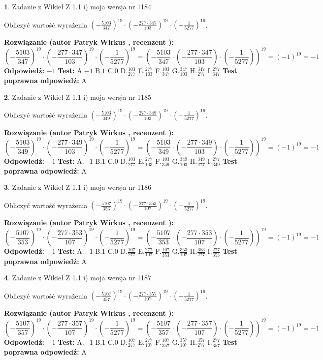 \documentclass[12pt, a4paper]{article}
\theoremstyle{definition} %
\newtheorem{zad}{}
\newcommand{\zadStart}[1]{\begin{zad}#1\newline}
\newcommand{\zadStop}{\end{zad}}
\newcommand{\rozwStart}[2]{\noindent \textbf{Rozwiązanie (autor #1 , recenzent #2): }\newline}
\newcommand{\rozwStop}{\newline}
\newcommand{\odpStart}{\noindent \textbf{Odpowiedź:}\newline}
\newcommand{\odpStop}{\newline}
\newcommand{\testStart}{\noindent \textbf{Test:}\newline}
\newcommand{\testStop}{\newline}
\newcommand{\kluczStart}{\noindent \textbf{Test poprawna odpowiedź:}\newline}
\newcommand{\kluczStop}{\newline}
\begin{document}
\zadStart{Zadanie z Wikieł Z 1.1 i) moja wersja nr 1184}

Obliczyć wartość wyrażenia $(-\frac{5103}{347})^{19} \cdot (-\frac{277 \cdot 347}{103})^{19} \cdot (-\frac{1}{5277})^{19}$.
\zadStop
\rozwStart{Patryk Wirkus}{}
$$(-\frac{5103}{347})^{19} \cdot (-\frac{277 \cdot 347}{103})^{19} \cdot (-\frac{1}{5277})^{19} = (-\frac{5103}{347} \cdot (-\frac{277 \cdot 347}{103}) \cdot (-\frac{1}{5277}))^{19} = (-1)^{19} = -1$$
\rozwStop
\odpStart
$-1$
\odpStop
\testStart
A.$-1$ B.$1$ C.$0$ D.$\frac{103}{277}$ E.$\frac{277}{103}$
F.$\frac{103}{347}$ G.$\frac{347}{103}$
H.$\frac{347}{277}$
I.$\frac{277}{347}$
\testStop
\kluczStart
A
\kluczStop



\zadStart{Zadanie z Wikieł Z 1.1 i) moja wersja nr 1185}

Obliczyć wartość wyrażenia $(-\frac{5103}{349})^{19} \cdot (-\frac{277 \cdot 349}{103})^{19} \cdot (-\frac{1}{5277})^{19}$.
\zadStop
\rozwStart{Patryk Wirkus}{}
$$(-\frac{5103}{349})^{19} \cdot (-\frac{277 \cdot 349}{103})^{19} \cdot (-\frac{1}{5277})^{19} = (-\frac{5103}{349} \cdot (-\frac{277 \cdot 349}{103}) \cdot (-\frac{1}{5277}))^{19} = (-1)^{19} = -1$$
\rozwStop
\odpStart
$-1$
\odpStop
\testStart
A.$-1$ B.$1$ C.$0$ D.$\frac{103}{277}$ E.$\frac{277}{103}$
F.$\frac{103}{349}$ G.$\frac{349}{103}$
H.$\frac{349}{277}$
I.$\frac{277}{349}$
\testStop
\kluczStart
A
\kluczStop



\zadStart{Zadanie z Wikieł Z 1.1 i) moja wersja nr 1186}

Obliczyć wartość wyrażenia $(-\frac{5107}{353})^{19} \cdot (-\frac{277 \cdot 353}{107})^{19} \cdot (-\frac{1}{5277})^{19}$.
\zadStop
\rozwStart{Patryk Wirkus}{}
$$(-\frac{5107}{353})^{19} \cdot (-\frac{277 \cdot 353}{107})^{19} \cdot (-\frac{1}{5277})^{19} = (-\frac{5107}{353} \cdot (-\frac{277 \cdot 353}{107}) \cdot (-\frac{1}{5277}))^{19} = (-1)^{19} = -1$$
\rozwStop
\odpStart
$-1$
\odpStop
\testStart
A.$-1$ B.$1$ C.$0$ D.$\frac{107}{277}$ E.$\frac{277}{107}$
F.$\frac{107}{353}$ G.$\frac{353}{107}$
H.$\frac{353}{277}$
I.$\frac{277}{353}$
\testStop
\kluczStart
A
\kluczStop



\zadStart{Zadanie z Wikieł Z 1.1 i) moja wersja nr 1187}

Obliczyć wartość wyrażenia $(-\frac{5107}{357})^{19} \cdot (-\frac{277 \cdot 357}{107})^{19} \cdot (-\frac{1}{5277})^{19}$.
\zadStop
\rozwStart{Patryk Wirkus}{}
$$(-\frac{5107}{357})^{19} \cdot (-\frac{277 \cdot 357}{107})^{19} \cdot (-\frac{1}{5277})^{19} = (-\frac{5107}{357} \cdot (-\frac{277 \cdot 357}{107}) \cdot (-\frac{1}{5277}))^{19} = (-1)^{19} = -1$$
\rozwStop
\odpStart
$-1$
\odpStop
\testStart
A.$-1$ B.$1$ C.$0$ D.$\frac{107}{277}$ E.$\frac{277}{107}$
F.$\frac{107}{357}$ G.$\frac{357}{107}$
H.$\frac{357}{277}$
I.$\frac{277}{357}$
\testStop
\kluczStart
A
\kluczStop
\end{document}
